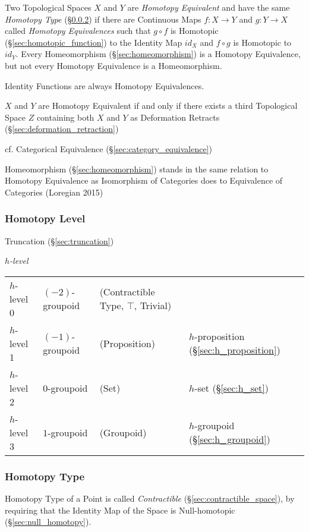 Two Topological Spaces $X$ and $Y$ are \emph{Homotopy Equivalent} and have the
same \emph{Homotopy Type} (\S\ref{sec:homotopy_type}) if there are Continuous
Maps $f : X \rightarrow Y$ and $g : Y \rightarrow X$ called \emph{Homotopy
Equivalences} such that $g \circ f$ is Homotopic
(\S\ref{sec:homotopic_function}) to the Identity Map $id_X$ and $f \circ g$ is
Homotopic to $id_Y$. Every Homeomorphism (\S\ref{sec:homeomorphism}) is a
Homotopy Equivalence, but not every Homotopy Equivalence is a Homeomorphism.

Identity Functions are always Homotopy Equivalences. %

$X$ and $Y$ are Homotopy Equivalent if and only if there exists a third
Topological Space $Z$ containing both $X$ and $Y$ as Deformation Retracts
(\S\ref{sec:deformation_retraction})

cf. Categorical Equivalence (\S\ref{sec:category_equivalence})

\fist Homeomorphism (\S\ref{sec:homeomorphism}) stands in the same relation to
Homotopy Equivalence as Isomorphism of Categories does to Equivalence of
Categories (Loregian 2015)



\subsubsection{Homotopy Level}\label{sec:homotopy_level}

Truncation (\S\ref{sec:truncation})

\emph{$h$-level}

\begin{tabular}{l l l l}
$h$-level 0   & $(-2)$-groupoid & (Contractible Type, $\top$, Trivial)
  & \\
$h$-level 1   & $(-1)$-groupoid & (Proposition)
  & $h$-proposition (\S\ref{sec:h_proposition}) \\
$h$-level 2   & $0$-groupoid    & (Set)
  & $h$-set (\S\ref{sec:h_set}) \\
$h$-level 3   & $1$-groupoid    & (Groupoid)
  & $h$-groupoid (\S\ref{sec:h_groupoid}) \\
\end{tabular}



\subsubsection{Homotopy Type}\label{sec:homotopy_type}

Homotopy Type of a Point is called \emph{Contractible}
(\S\ref{sec:contractible_space}), by requiring that the Identity Map
of the Space is Null-homotopic (\S\ref{sec:null_homotopy}).

